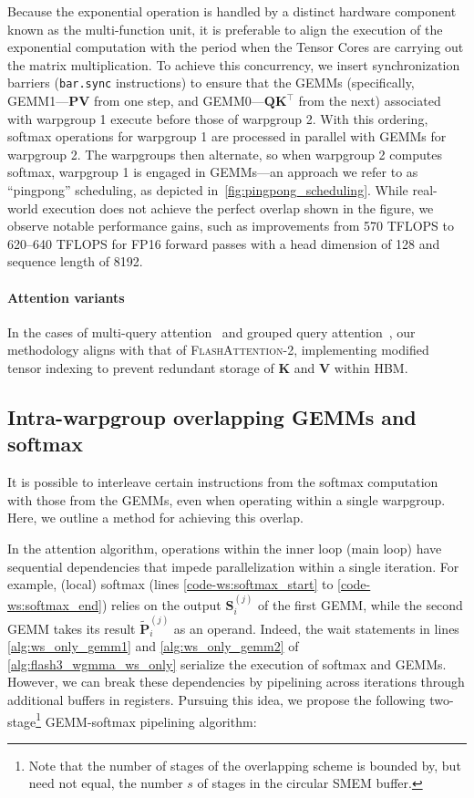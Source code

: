 Because the exponential operation is handled by a distinct hardware component known as the multi-function unit, it is preferable to align the execution of the exponential computation with the period when the Tensor Cores are carrying out the matrix multiplication. To achieve this concurrency, we insert synchronization barriers (\texttt{bar.sync} instructions) to ensure that the GEMMs (specifically, GEMM1—$\mathbf{P} \mathbf{V}$ from one step, and GEMM0—$\mathbf{Q} \mathbf{K}^\top$ from the next) associated with warpgroup 1 execute before those of warpgroup 2. With this ordering, softmax operations for warpgroup 1 are processed in parallel with GEMMs for warpgroup 2. The warpgroups then alternate, so when warpgroup 2 computes softmax, warpgroup 1 is engaged in GEMMs—an approach we refer to as ``pingpong'' scheduling, as depicted in~\cref{fig:pingpong_scheduling}. While real-world execution does not achieve the perfect overlap shown in the figure, we observe notable performance gains, such as improvements from 570 TFLOPS to 620–640 TFLOPS for FP16 forward passes with a head dimension of 128 and sequence length of 8192.

\paragraph{Attention variants} In the cases of multi-query attention~\citep{shazeer2019fast} and grouped query attention~\citep{ainslie2023gqa}, our methodology aligns with that of \textsc{FlashAttention-2}, implementing modified tensor indexing to prevent redundant storage of $\mathbf{K}$ and $\mathbf{V}$ within HBM.

\subsection{Intra-warpgroup overlapping GEMMs and softmax}

It is possible to interleave certain instructions from the softmax computation with those from the GEMMs, even when operating within a single warpgroup. Here, we outline a method for achieving this overlap.

In the attention algorithm, operations within the inner loop (main loop) have sequential dependencies that impede parallelization within a single iteration. For example, (local) softmax (lines \ref{code-ws:softmax_start} to \ref{code-ws:softmax_end}) relies on the output $\mathbf{S}_i^{(j)}$ of the first GEMM, while the second GEMM takes its result $\widetilde{\mathbf{P}}_i^{(j)}$ as an operand. Indeed, the wait statements in lines \ref{alg:ws_only_gemm1} and \ref{alg:ws_only_gemm2} of \cref{alg:flash3_wgmma_ws_only} serialize the execution of softmax and GEMMs. However, we can break these dependencies by pipelining across iterations through additional buffers in registers. Pursuing this idea, we propose the following two-stage\footnote{Note that the number of stages of the overlapping scheme is bounded by, but need not equal, the number $s$ of stages in the circular SMEM buffer.} GEMM-softmax pipelining algorithm:


